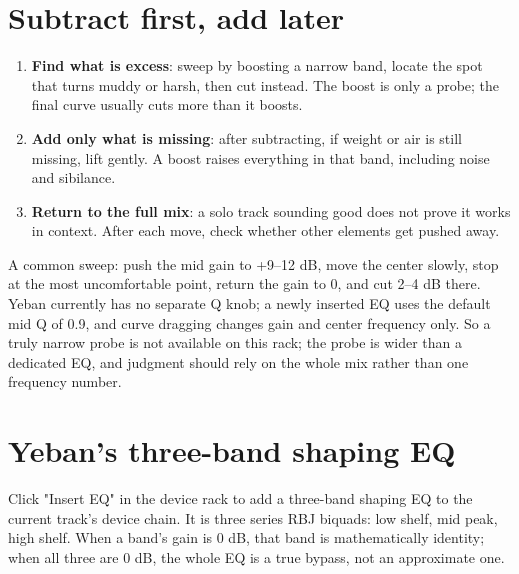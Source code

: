\section{Subtract first, add later}

\begin{enumerate}
  \item \textbf{Find what is excess}: sweep by boosting a narrow band, locate the spot that turns muddy or harsh, then cut instead. The boost is only a probe; the final curve usually cuts more than it boosts.
  \item \textbf{Add only what is missing}: after subtracting, if weight or air is still missing, lift gently. A boost raises everything in that band, including noise and sibilance.
  \item \textbf{Return to the full mix}: a solo track sounding good does not prove it works in context. After each move, check whether other elements get pushed away.
\end{enumerate}

A common sweep: push the mid gain to +9–12 dB, move the center slowly, stop at the most uncomfortable point, return the gain to 0, and cut 2–4 dB there. Yeban currently has no separate Q knob; a newly inserted EQ uses the default mid Q of 0.9, and curve dragging changes gain and center frequency only. So a truly narrow probe is not available on this rack; the probe is wider than a dedicated EQ, and judgment should rely on the whole mix rather than one frequency number.

\section{Yeban's three-band shaping EQ}

Click "Insert EQ" in the device rack to add a three-band shaping EQ to the current track's device chain. It is three series RBJ biquads: low shelf, mid peak, high shelf. When a band's gain is 0 dB, that band is mathematically identity; when all three are 0 dB, the whole EQ is a true bypass, not an approximate one.

